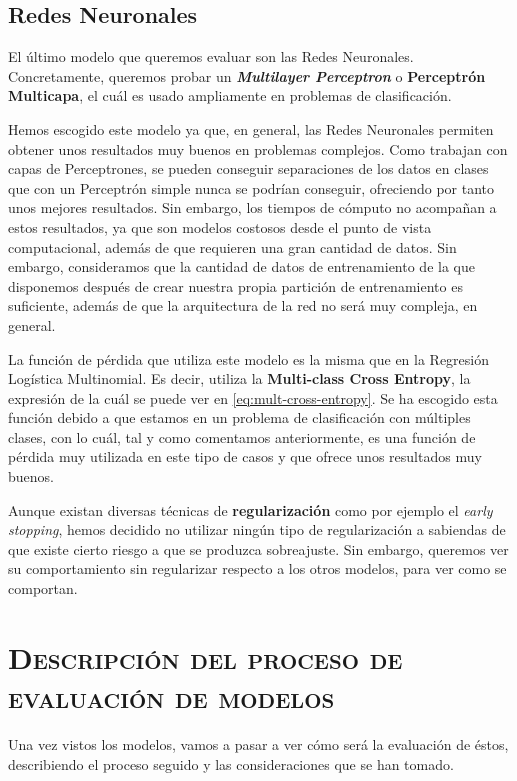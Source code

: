 \documentclass[11pt,a4paper]{article}
\begin{document}
\subsection{Redes Neuronales}

El último modelo que queremos evaluar son las Redes Neuronales. Concretamente, queremos probar un \textbf{\textit{Multilayer Perceptron}} o
\textbf{Perceptrón Multicapa}, el cuál es usado ampliamente en problemas de clasificación.

Hemos escogido este modelo ya que, en general, las Redes Neuronales permiten obtener unos resultados muy buenos en problemas complejos.
Como trabajan con capas de Perceptrones, se pueden conseguir separaciones de los datos en clases que con un Perceptrón simple nunca se
podrían conseguir, ofreciendo por tanto unos mejores resultados. Sin embargo, los tiempos de cómputo no acompañan a estos resultados, ya que
son modelos costosos desde el punto de vista computacional, además de que requieren una gran cantidad de datos. Sin embargo, consideramos que
la cantidad de datos de entrenamiento de la que disponemos después de crear nuestra propia partición de entrenamiento es suficiente, además
de que la arquitectura de la red no será muy compleja, en general.

La función de pérdida que utiliza este modelo es la misma que en la Regresión Logística Multinomial. Es decir, utiliza la \textbf{Multi-class
Cross Entropy}, la expresión de la cuál se puede ver en \eqref{eq:mult-cross-entropy}. Se ha escogido esta función debido a que estamos
en un problema de clasificación con múltiples clases, con lo cuál, tal y como comentamos anteriormente, es una función de pérdida muy utilizada
en este tipo de casos y que ofrece unos resultados muy buenos.

Aunque existan diversas técnicas de \textbf{regularización} como por ejemplo el \textit{early stopping}, hemos decidido no utilizar ningún tipo de
regularización a sabiendas de que existe cierto riesgo a que se produzca sobreajuste. Sin embargo, queremos ver su comportamiento sin
regularizar respecto a los otros modelos, para ver como se comportan.

\section{\textsc{Descripción del proceso de evaluación de modelos}}

Una vez vistos los modelos, vamos a pasar a ver cómo será la evaluación de éstos, describiendo el proceso seguido y las consideraciones que
se han tomado.
\end{document}
